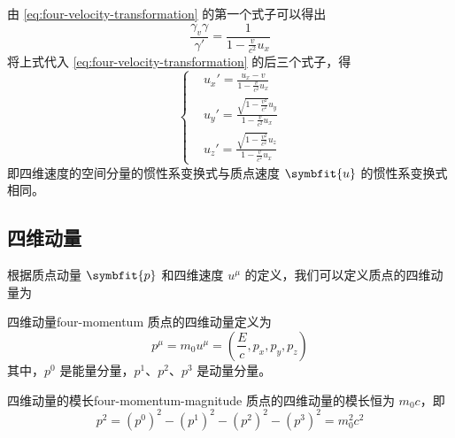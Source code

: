 由 \cref{eq:four-velocity-transformation} 的第一个式子可以得出
\begin{equation}
    \frac{\gamma_v \gamma}{\gamma'} = \frac{1}{1 - \frac{v}{c^2} u_x}
\end{equation}
将上式代入 \cref{eq:four-velocity-transformation} 的后三个式子，得
\begin{equation}
    \left\{
    \begin{aligned}
         & u_x' = \frac{u_x - v}{1 - \frac{v}{c^2} u_x}                        \\
         & u_y' = \frac{\sqrt{1 - \frac{v^2}{c^2}} u_y}{1 - \frac{v}{c^2} u_x} \\
         & u_z' = \frac{\sqrt{1 - \frac{v^2}{c^2}} u_z}{1 - \frac{v}{c^2} u_x}
    \end{aligned}
    \right.
\end{equation}
即四维速度的空间分量的惯性系变换式与质点速度 $\symbfit{u}$ 的惯性系变换式相同。

\subsection{四维动量}

根据质点动量 $\symbfit{p}$ 和四维速度 $u^\mu$ 的定义，我们可以定义质点的四维动量为
\begin{definition}{四维动量}{four-momentum}
    质点的四维动量定义为
    \begin{equation}
        p^\mu = m_0 u^\mu = \left( \frac{E}{c}, p_x, p_y, p_z \right)
    \end{equation}
    其中，$p^0$ 是能量分量，$p^1$、$p^2$、$p^3$ 是动量分量。
\end{definition}

\begin{theorem}{四维动量的模长}{four-momentum-magnitude}
    质点的四维动量的模长恒为 $m_0 c$，即
    \begin{equation}
        p^2 = (p^0)^2 - (p^1)^2 - (p^2)^2 - (p^3)^2 = m_0^2 c^2
    \end{equation}
\end{theorem}

